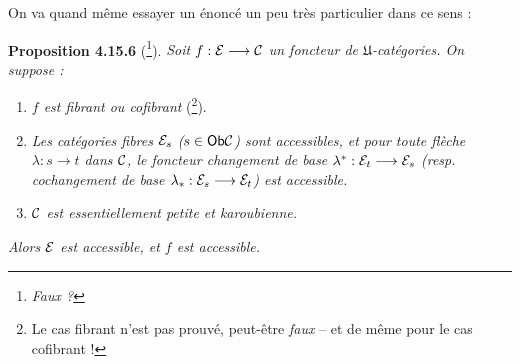 On va quand même essayer un énoncé un peu très particulier dans ce sens :

\textbf{Proposition 4.15.6} (\footnote[180]{\textit{Faux ?}}). \textit{Soit $f : \mathcal{E} \longrightarrow \mathcal{C}$ un foncteur de $\mathfrak{U}$-catégories. On suppose :}
\begin{enumerate}
\item[\textit{a)}] \textit{$f$ est fibrant ou cofibrant} (\footnote[181]{Le cas fibrant n'est pas prouvé, peut-être \textit{faux} -- et de même pour le cas cofibrant !}).
\item[\textit{b)}] \textit{Les catégories fibres $\mathcal{E}_s$ ($s \in \mathsf{Ob} \mathcal{C}$) sont accessibles, et pour toute flèche $\lambda : s \longrightarrow t$ dans $\mathcal{C}$, le foncteur changement de base $\lambda^* : \mathcal{E}_t \longrightarrow \mathcal{E}_s$ (resp. cochangement de base $\lambda_* : \mathcal{E}_s \longrightarrow \mathcal{E}_t$) est accessible.}
\item[\textit{c)}] \textit{$\mathcal{C}$ est essentiellement petite et karoubienne.}
\end{enumerate}
\textit{Alors $\mathcal{E}$ est accessible, et $f$ est accessible.}

